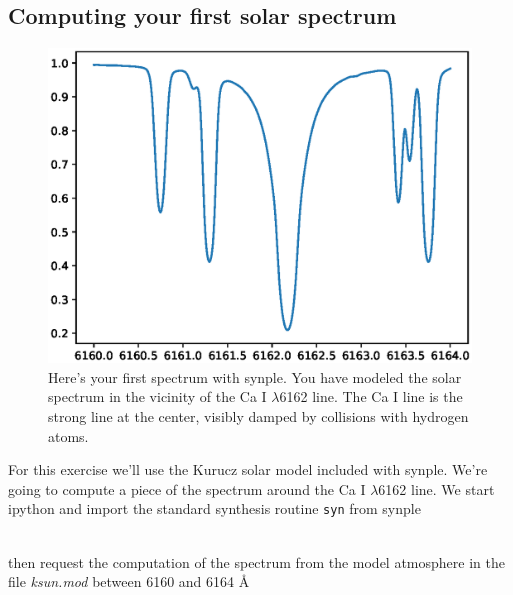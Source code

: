 \documentclass[]{article}
\begin{document}
\subsection{Computing your first solar spectrum}
\label{6162}


\begin{figure}[t!]
\centering
\includegraphics[width=14cm]{Figure_1.ps}
\caption{Here's your first spectrum with synple. You have modeled the solar spectrum in the vicinity of the Ca I $\lambda$6162 line. The Ca I line is the strong line at the center, visibly damped by collisions with hydrogen atoms.
\label{first}
}
\end{figure}


For this exercise we'll use the Kurucz solar model included with synple. We're going to compute a piece of the spectrum around the Ca I $\lambda$6162 line. We start ipython and import the standard synthesis routine {\tt syn} from synple
\\
\\

\noindent then request the computation of the spectrum from the model atmosphere in the file {\it ksun.mod} between 6160 and 6164 \AA\
\\
\\
\end{document}

